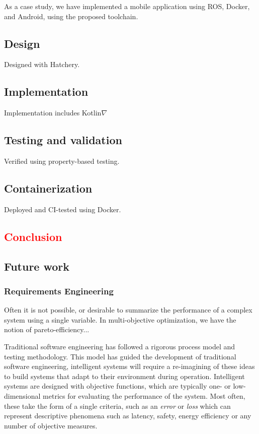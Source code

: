 \documentclass[12pt,initial,twoside,maitrise]{dms}
\newcommand{\rare}[1]{\textcolor{red}{#1}}
\numberwithin{equation}{section}
\numberwithin{table}{chapter}
\numberwithin{figure}{chapter}
\begin{document}
As a case study, we have implemented a mobile application using ROS, Docker, and Android, using the proposed toolchain.

\section{Design}

Designed with Hatchery.

\section{Implementation}

Implementation includes Kotlin$\nabla$

\section{Testing and validation}

Verified using property-based testing.

\section{Containerization}

Deployed and CI-tested using Docker.

\rare{\chapter{Conclusion}\label{ch:conclusion}}

\section{Future work}

\subsection{Requirements Engineering}

Often it is not possible, or desirable to summarize the performance of a complex system using a single variable. In multi-objective optimization, we have the notion of pareto-efficiency...

Traditional software engineering has followed a rigorous process model and testing methodology. This model has guided the development of traditional software engineering, intelligent systems will require a re-imagining of these ideas to build systems that adapt to their environment during operation. Intelligent systems are designed with objective functions, which are typically one- or low-dimensional metrics for evaluating the performance of the system. Most often, these take the form of a single criteria, such as an \textit{error} or \textit{loss} which can represent descriptive phenomena such as latency, safety, energy efficiency or any number of objective measures.
\end{document}
